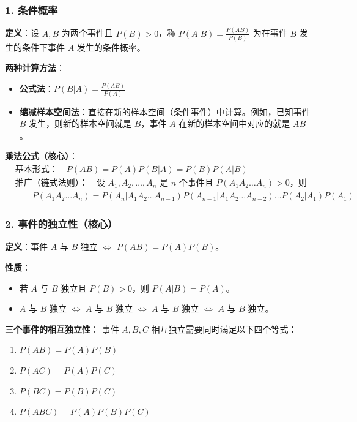 \documentclass[12pt,a4paper]{ctexart}
\begin{document}
\subsubsection{1. 条件概率}
\textbf{定义}：设 $A, B$ 为两个事件且 $P(B) > 0$，称 $\displaystyle P(A|B) = \frac{P(AB)}{P(B)}$ 为在事件 $B$ 发生的条件下事件 $A$ 发生的条件概率。

\textbf{两种计算方法}：
\begin{itemize}[noitemsep]
    \item \textbf{公式法}：$\displaystyle P(B|A) = \frac{P(AB)}{P(A)}$
    \item \textbf{缩减样本空间法}：直接在新的样本空间（条件事件）中计算。例如，已知事件 $B$ 发生，则新的样本空间就是 $B$，事件 $A$ 在新的样本空间中对应的就是 $AB$。
\end{itemize}

\textbf{乘法公式（核心）}：
\begin{align*}
     & \text{基本形式：}\quad P(AB) = P(A)P(B|A) = P(B)P(A|B)                                                                         \\
     & \text{推广（链式法则）：}\quad \text{设 }A_1, A_2, \dots, A_n\text{ 是 }n\text{ 个事件且 }P(A_1 A_2 \dots A_n) > 0\text{，则}              \\
     & \qquad P(A_1 A_2 \dots A_n) = P(A_n | A_1 A_2 \dots A_{n-1}) P(A_{n-1} | A_1 A_2 \dots A_{n-2}) \dots P(A_2 | A_1) P(A_1)
\end{align*}

\subsubsection{2. 事件的独立性（核心）}
\textbf{定义}：事件 $A$ 与 $B$ 独立 $\iff$ $P(AB) = P(A)P(B)$。

\textbf{性质}：
\begin{itemize}[noitemsep]
    \item 若 $A$ 与 $B$ 独立且 $P(B) > 0$，则 $P(A|B) = P(A)$。
    \item $A$ 与 $B$ 独立 $\iff$ $A$ 与 $\bar{B}$ 独立 $\iff$ $\bar{A}$ 与 $B$ 独立 $\iff$ $\bar{A}$ 与 $\bar{B}$ 独立。
\end{itemize}

\textbf{三个事件的相互独立性}：
事件 $A, B, C$ 相互独立需要同时满足以下四个等式：
\begin{enumerate}[noitemsep]
    \item $P(AB) = P(A)P(B)$
    \item $P(AC) = P(A)P(C)$
    \item $P(BC) = P(B)P(C)$
    \item $P(ABC) = P(A)P(B)P(C)$
\end{enumerate}
\end{document}
